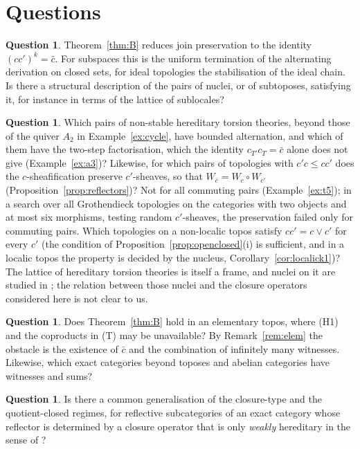 \documentclass[11pt]{amsart}
\theoremstyle{definition}
\newtheorem{que}[thm]{Question}
\begin{document}
\section{Questions}

\begin{que}
Theorem~\ref{thm:B} reduces join preservation to the identity
$(cc')^k=\bar c$. For subspaces this is the uniform termination of the
alternating derivation on closed sets, for ideal topologies the
stabilisation of the ideal chain. Is there a structural description of the
pairs of nuclei, or of subtoposes, satisfying it, for instance in terms of
the lattice of sublocales?
\end{que}

\begin{que}\label{que:two}
Which pairs of non-stable hereditary torsion theories, beyond
those of the quiver $A_2$ in Example~\ref{ex:cycle}, have bounded
alternation, and which of them have the two-step factorisation, which
the identity $c_{T'}c_T=\bar c$ alone does not give
(Example~\ref{ex:a3})? Likewise, for which pairs of topologies with
$c'c\le cc'$ does the $c$-sheafification preserve $c'$-sheaves, so that
$W_{\bar c}=W_c\circ W_{c'}$ (Proposition~\ref{prop:reflectors})? Not for
all commuting pairs (Example~\ref{ex:t5}); in a search over all
Grothendieck topologies on the categories with two objects and at most six
morphisms, testing random $c'$-sheaves, the preservation failed only for
commuting pairs. Which topologies on a non-localic topos
satisfy $cc'=c\vee c'$ for every $c'$ (the condition of
Proposition~\ref{prop:openclosed}(i) is sufficient, and in a localic topos
the property is decided by the nucleus, Corollary~\ref{cor:localick1})? The lattice of
hereditary torsion theories is itself a frame, and nuclei on it are
studied in \cite{GolanSimmons}; the relation between those nuclei and the
closure operators considered here is not clear to us.
\end{que}

\begin{que}
Does Theorem~\ref{thm:B} hold in an elementary topos, where (H1) and the
coproducts in (T) may be unavailable? By Remark~\ref{rem:elem} the obstacle
is the existence of $\bar c$ and the combination of infinitely many
witnesses. Likewise, which exact categories beyond toposes and abelian
categories have witnesses and sums?
\end{que}

\begin{que}
Is there a common generalisation of the closure-type and the
quotient-closed regimes, for reflective subcategories of an exact category
whose reflector is determined by a closure operator that is only
\emph{weakly} hereditary in the sense of \cite{DT}?
\end{que}
\end{document}
